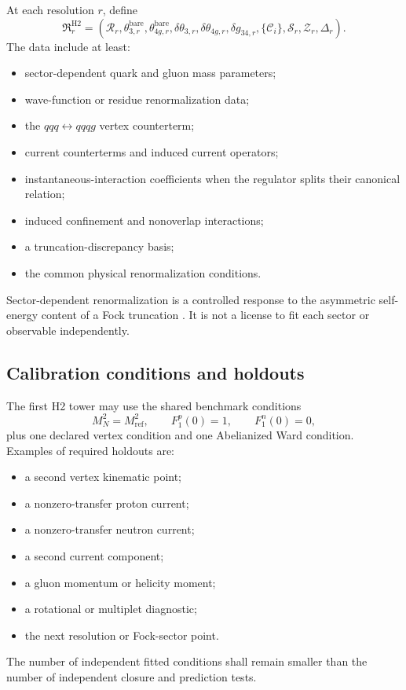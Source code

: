 \documentclass[11pt]{article}
\newcommand{\cR}{\mathcal R}
\newcommand{\cS}{\mathcal S}
\newcommand{\cC}{\mathcal C}
\newcommand{\cZ}{\mathcal Z}
\newcommand{\bare}{\mathrm{bare}}
\begin{document}
At each resolution \(r\), define
\begin{equation}
 \mathfrak R_{r}^{\mathrm{H2}}
 =
 \left(
 \cR_r,
 \theta_{3,r}^{\bare},
 \theta_{4g,r}^{\bare},
 \delta\theta_{3,r},
 \delta\theta_{4g,r},
 \delta g_{34,r},
 \{\cC_i\},
 \cS_r,
 \cZ_r,
 \Delta_r
 \right).
 \label{eq:ren-datum}
\end{equation}
The data include at least:
\begin{itemize}
 \item sector-dependent quark and gluon mass parameters;
 \item wave-function or residue renormalization data;
 \item the \(qqq\leftrightarrow qqqg\) vertex counterterm;
 \item current counterterms and induced current operators;
 \item instantaneous-interaction coefficients when the regulator splits their
 canonical relation;
 \item induced confinement and nonoverlap interactions;
 \item a truncation-discrepancy basis;
 \item the common physical renormalization conditions.
\end{itemize}
Sector-dependent renormalization is a controlled response to the asymmetric
self-energy content of a Fock truncation
\cite{Karmanov2008,Chabysheva2017}.  It is not a license to fit each sector or
observable independently.

\subsection{Calibration conditions and holdouts}

The first H2 tower may use the shared benchmark conditions
\begin{equation}
 M_N^2=M_{\mathrm{ref}}^2,
 \qquad
 F_1^p(0)=1,
 \qquad
 F_1^n(0)=0,
 \label{eq:h2-calibration}
\end{equation}
plus one declared vertex condition and one Abelianized Ward condition.
Examples of required holdouts are:
\begin{itemize}
 \item a second vertex kinematic point;
 \item a nonzero-transfer proton current;
 \item a nonzero-transfer neutron current;
 \item a second current component;
 \item a gluon momentum or helicity moment;
 \item a rotational or multiplet diagnostic;
 \item the next resolution or Fock-sector point.
\end{itemize}
The number of independent fitted conditions shall remain smaller than the
number of independent closure and prediction tests.
\end{document}
